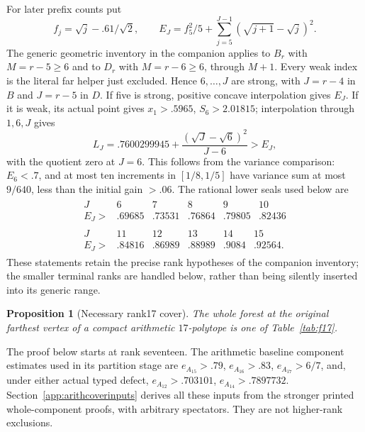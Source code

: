 \documentclass[11pt]{article}
\newtheorem{proposition}[theorem]{Proposition}
\begin{document}
For later prefix counts put
\[
 f_j=\sqrt j-.61/\sqrt2,\qquad
 E_J=f_5^2/5+\sum_{j=5}^{J-1}(\sqrt{j+1}-\sqrt j)^2.
\]
The generic geometric inventory in the companion applies to $B_r$
with $M=r-5\ge6$ and to $D_r$ with $M=r-6\ge6$, through
$M+1$. Every weak index is the literal far helper just excluded.
Hence $6,\ldots,J$ are strong, with $J=r-4$ in $B$ and $J=r-5$
in $D$. If five is strong, positive concave interpolation gives $E_J$.
If it is weak, its actual point gives $x_1>.5965$, $S_6>2.01815$;
interpolation through $1,6,J$ gives
\[
 L_J=.7600299945+\frac{(\sqrt J-\sqrt6)^2}{J-6}>E_J,
\]
with the quotient zero at $J=6$. This follows from the variance
comparison: $E_6<.7$, and at most ten increments in $[1/8,1/5]$
have variance sum at most $9/640$, less than the initial gain $>.06$.
The rational lower seals used below are
\begin{equation}\label{eq:prefixfloors}
\begin{gathered}
\begin{array}{c|rrrrr}
J&6&7&8&9&10\\\hline
E_J>&.69685&.73531&.76864&.79805&.82436
\end{array}\\[4pt]
\begin{array}{c|rrrrr}
J&11&12&13&14&15\\\hline
E_J>&.84816&.86989&.88989&.9084&.92564.
\end{array}
\end{gathered}
\end{equation}
These statements retain the precise rank hypotheses of the companion
inventory; the smaller terminal ranks are handled below, rather than
being silently inserted into its generic range.

\begin{proposition}[Necessary rank17 cover]\label{prop:f17}
The whole forest at the original farthest vertex of a compact
arithmetic $17$-polytope is one of Table~\ref{tab:f17}.
\end{proposition}
The proof below starts at rank seventeen. The arithmetic baseline
component estimates used in its partition stage are $e_{A_{15}}>.79$,
$e_{A_{16}}>.83$, $e_{A_{17}}>6/7$, and, under either actual typed
defect, $e_{A_{12}}>.703101$, $e_{A_{14}}>.7897732$.
Section~\ref{app:arithcoverinputs} derives all these inputs from the
stronger printed whole-component proofs, with arbitrary spectators.
They are not higher-rank exclusions.
\end{document}
